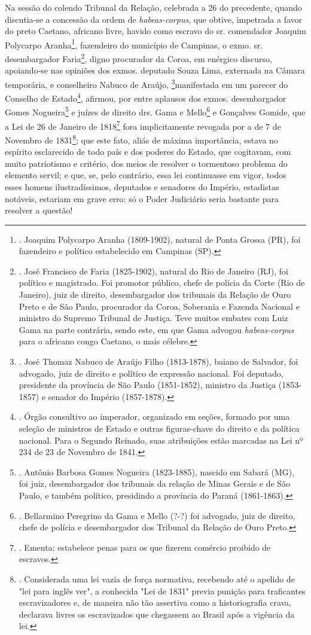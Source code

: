 Na sessão do colendo Tribunal da Relação, celebrada a 26 do precedente,
quando discutia-se a concessão da ordem de \emph{habeas-corpus}, que
obtive, impetrada a favor do preto Caetano, africano livre, havido como
escravo do sr. comendador Joaquim Polycarpo Aranha\footnote{. Joaquim
  Polycarpo Aranha (1809-1902), natural de Ponta Grossa (PR), foi
  fazendeiro e político estabelecido em Campinas (SP).}, fazendeiro do
município de Campinas, o exmo. sr. desembargador Faria\footnote{. José
  Francisco de Faria (1825-1902), natural do Rio de Janeiro (RJ), foi
  político e magistrado. Foi promotor público, chefe de polícia da Corte
  (Rio de Janeiro), juiz de direito, desembargador dos tribunais da
  Relação de Ouro Preto e de São Paulo, procurador da Coroa, Soberania e
  Fazenda Nacional e ministro do Supremo Tribunal de Justiça. Teve
  muitos embates com Luiz Gama na parte contrária, sendo este, em que
  Gama advogou \emph{habeas-corpus} para o africano congo Caetano, o
  mais célebre.}, digno procurador da Coroa, em enérgico discurso,
apoiando-se nas opiniões dos exmos. deputado Souza Lima, externada na
Câmara temporária, e conselheiro Nabuco de Araújo, \footnote{. José
  Thomaz Nabuco de Araújo Filho (1813-1878), baiano de Salvador, foi
  advogado, juiz de direito e político de expressão nacional. Foi
  deputado, presidente da província de São Paulo (1851-1852), ministro
  da Justiça (1853-1857) e senador do Império (1857-1878).}manifestada
em um parecer do Conselho de Estado\footnote{. Órgão consultivo ao
  imperador, organizado em seções, formado por uma seleção de ministros
  de Estado e outras figuras-chave do direito e da política nacional.
  Para o Segundo Reinado, suas atribuições estão marcadas na Lei nº 234
  de 23 de Novembro de 1841.}, afirmou, por entre aplausos dos exmos.
desembargador Gomes Nogueira\footnote{. Antônio Barbosa Gomes Nogueira
  (1823-1885), nascido em Sabará (MG), foi juiz, desembargador dos
  tribunais da relação de Minas Gerais e de São Paulo, e também
  político, presidindo a província do Paraná (1861-1863).} e juízes de
direito drs. Gama e Mello\footnote{. Bellarmino Peregrino da Gama e
  Mello (?-?) foi advogado, juiz de direito, chefe de polícia e
  desembargador dos Tribunal da Relação de Ouro Preto.} e Gonçalves
Gomide, que a Lei de 26 de Janeiro de 1818\footnote{. Ementa: estabelece
  penas para os que fizerem comércio proibido de escravos.} fora
implicitamente revogada por a de 7 de Novembro de 1831\footnote{.
  Considerada uma lei vazia de força normativa, recebendo até o apelido
  de "lei para inglês ver", a conhecida "Lei de 1831" previa punição
  para traficantes escravizadores e, de maneira não tão assertiva como a
  historiografia crava, declarava livres os escravizados que chegassem
  ao Brasil após a vigência da lei.}; que este fato, aliás de máxima
importância, estava no espírito esclarecido de todo país e dos poderes
do Estado, que cogitavam, com muito patriotismo e critério, dos meios de
resolver o tormentoso problema do elemento servil; e que, se, pelo
contrário, essa lei continuasse em vigor, todos esses homens
ilustradíssimos, deputados e senadores do Império, estadistas notáveis,
estariam em grave erro: só o Poder Judiciário seria bastante para
resolver a questão!

